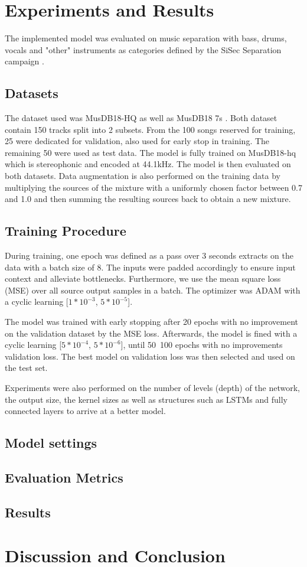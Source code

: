 \documentclass[final]{cvpr}
\begin{document}
\section{Experiments and Results}
 The implemented model was evaluated on music separation with bass, drums, vocals and "other" instruments as categories defined by the SiSec Separation campaign \cite{SiSec}.
\subsection{Datasets}
The dataset used was MusDB18-HQ \cite{MUSDB18HQ} as well as MusDB18 7s \cite{musdb18}. Both dataset contain 150 tracks split into 2 subsets. From the 100 songs reserved for training, 25 were dedicated for validation, also used for early stop in training. The remaining 50 were used as test data. The model is fully trained on MusDB18-hq which is stereophonic and encoded at 44.1kHz. The model is then evaluated on both datasets.
Data augmentation is also performed on the training data by multiplying the sources of the mixture with a uniformly chosen factor between 0.7 and 1.0 and then summing the resulting sources back to obtain a new mixture.\cite{waveunet}  
\subsection{Training Procedure}
During training, one epoch was defined as a pass over 3 seconds extracts on the data with a batch size of 8. The inputs were padded accordingly to ensure input context and alleviate bottlenecks. Furthermore, we use the mean square loss (MSE) over all source output samples in a batch. The optimizer was ADAM with a cyclic learning [$1*10^{-3}$, $5*10^{-5}$]. 

The model was trained with early stopping after 20 epochs with no improvement on the validation dataset by the MSE loss. Afterwards, the model is fined with a cyclic learning [$5*10^{-4}$, $5*10^{-6}$], until 50~100 epochs with no improvements validation loss. The best model on validation loss was then selected and used on the test set. 

Experiments were also performed on the number of levels (depth) of the network, the output size, the kernel sizes as well as structures such as LSTMs and fully connected layers to arrive at a better model.   
\subsection{Model settings}

\subsection{Evaluation Metrics}

\subsection{Results}
\section*{Discussion and Conclusion}
{\small


}
\end{document}
